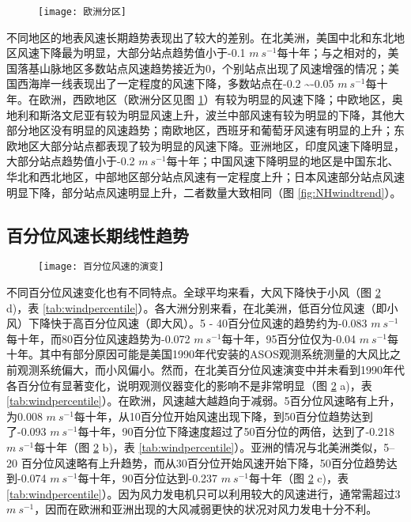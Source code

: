 \begin{figure}[!b]
    \centering
    \texttt{[image: 欧洲分区]}
    \label{fig:EU}
\end{figure}

不同地区的地表风速长期趋势表现出了较大的差别。在北美洲，美国中北和东北地区风速下降最为明显，大部分站点趋势值小于-0.1 $m ~ s^{-1}$每十年；与之相对的，美国落基山脉地区多数站点风速趋势接近为0，个别站点出现了风速增强的情况；美国西海岸一线表现出了一定程度的风速下降，多数站点在-0.2 \textasciitilde -0.05 $m ~ s^{-1}$每十年。在欧洲，西欧地区（欧洲分区见图 \ref{fig:EU}）有较为明显的风速下降；中欧地区，奥地利和斯洛文尼亚有较为明显风速上升，波兰中部风速有较为明显的下降，其他大部分地区没有明显的风速趋势；南欧地区，西班牙和葡萄牙风速有明显的上升；东欧地区大部分站点都表现了较为明显的风速下降。亚洲地区，印度风速下降明显，大部分站点趋势值小于-0.2 $m ~ s^{-1}$每十年；中国风速下降明显的地区是中国东北、华北和西北地区，中部地区部分站点风速有一定程度上升；日本风速部分站点风速明显下降，部分站点风速明显上升，二者数量大致相同（图 \ref{fig:NHwindtrend}）。

\subsection{百分位风速长期线性趋势}

\begin{figure}[!hb]
    \centering
    \texttt{[image: 百分位风速的演变]}
    \label{fig:windpercentile}
\end{figure}

不同百分位风速变化也有不同特点。全球平均来看，大风下降快于小风（图 \ref{fig:windpercentile} d)，表 \ref{tab:windpercentile}）。各大洲分别来看，在北美洲，低百分位风速（即小风）下降快于高百分位风速（即大风）。5 - 40百分位风速的趋势约为-0.083 $m ~ s^{-1}$每十年，而80百分位风速趋势为-0.072 $m ~ s^{-1}$每十年，95百分位仅为-0.04 $m ~ s^{-1}$每十年。其中有部分原因可能是美国1990年代安装的ASOS观测系统测量的大风比之前观测系统偏大，而小风偏小\citep{mckee2000climate}。然而，在北美百分位风速演变中并未看到1990年代各百分位有显著变化，说明观测仪器变化的影响不是非常明显（图 \ref{fig:windpercentile} a)，表 \ref{tab:windpercentile}）。在欧洲，风速越大越趋向于减弱。5百分位风速略有上升，为0.008 $m ~ s^{-1}$每十年，从10百分位开始风速出现下降，到50百分位趋势达到了-0.093 $m ~ s^{-1}$每十年，90百分位下降速度超过了50百分位的两倍，达到了-0.218 $m ~ s^{-1}$每十年（图 \ref{fig:windpercentile} b)，表 \ref{tab:windpercentile}）。亚洲的情况与北美洲类似，5–20 百分位风速略有上升趋势，而从30百分位开始风速开始下降，50百分位趋势达到-0.074 $m ~ s^{-1}$每十年，90百分位达到-0.237 $m ~s^{-1}$每十年（图 \ref{fig:windpercentile} c)，表 \ref{tab:windpercentile}）。因为风力发电机只可以利用较大的风速进行，通常需超过3 $m ~s^{-1}$，因而在欧洲和亚洲出现的大风减弱更快的状况对风力发电十分不利。

